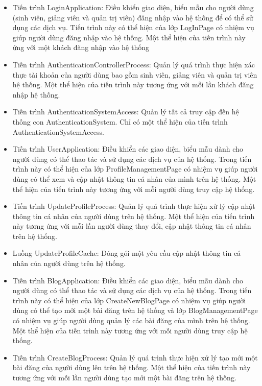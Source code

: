 \documentclass[./../main.tex]{subfiles}
\begin{document}
\begin{itemize}
	\item Tiến trình LoginApplication: Điều khiển giao diện, biểu mẫu cho người dùng (sinh viên, giảng viên và quản trị viên) đăng nhập vào hệ thống để có thể sử dụng các dịch vụ. Tiến trình này có thể hiện của lớp LogInPage có nhiệm vụ giúp người dùng đăng nhập vào hệ thống.
	      Một thể hiện của tiến trình này ứng với một khách đăng nhập vào hệ thống
	\item Tiến trình AuthenticationControllerProcess: Quản lý quá trình thực hiện xác thực tài khoản của người dùng bao gồm sinh viên, giảng viên và quản trị viên hệ thống.
	      Một thể hiện của tiến trình này tương ứng với mỗi lần khách đăng nhập hệ thống.
	\item Tiến trình AuthenticationSystemAccess: Quản lý tất cả truy cập đến hệ thống con AuthenticationSystem.
	      Chỉ có một thể hiện của tiến trình AuthenticationSystemAccess.
	\item Tiến trình UserApplication: Điều khiển các giao diện, biểu mẫu dành cho người dùng có thể thao tác và sử dụng các dịch vụ của hệ thống. Trong tiến trình này có  thể hiện của lớp ProfileManagementPage có nhiệm vụ giúp người dùng có thể xem và cập nhật thông tin cá nhân của mình trên hệ thống.
	      Một thể hiện của tiến trình này tương ứng với mỗi người dùng truy cập hệ thống.
	\item Tiến trình UpdateProfileProcess: Quản lý quá trình thực hiện xử lý cập nhật thông tin cá nhân của người dùng trên hệ thống.
	      Một thể hiện của tiến trình này tương ứng với mỗi lần người dùng thay đổi, cập nhật thông tin cá nhân trên hệ thống.
	\item Luồng UpdateProfileCache: Đóng gói một yêu cầu cập nhật thông tin cá nhân của người dùng trên hệ thống.
	\item Tiến trình BlogApplication: Điều khiển các giao diện, biểu mẫu dành cho người dùng có thể thao tác và sử dụng các dịch vụ của hệ thống. Trong tiến trình này có thể hiện của lớp CreateNewBlogPage có nhiệm vụ giúp người dùng có thể tạo mới một bài đăng trên hệ thống và lớp BlogManagementPage có nhiệm vụ giúp người dùng quản lý các bài đăng của mình trên hệ thống.
	      Một thể hiện của tiến trình này tương ứng với mỗi người dùng truy cập hệ thống.
	\item Tiến trình CreateBlogProcess: Quản lý quá trình thực hiện xử lý tạo mới một bài đăng của người dùng lên trên hệ thống.
	      Một thể hiện của tiến trình này tương ứng với mỗi lần người dùng tạo mới một bài đăng trên hệ thống.

\end{itemize}
\end{document}
